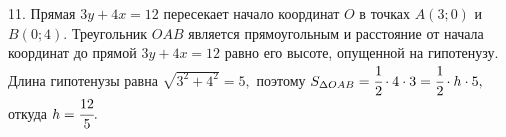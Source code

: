 11. Прямая $3y+4x=12$ пересекает начало координат $O$ в точках $A(3;0)$ и $B(0;4).$ Треугольник $OAB$ является прямоугольным и расстояние от начала координат до прямой $3y+4x=12$ равно его высоте, опущенной на гипотенузу. Длина гипотенузы равна $\sqrt{3^2+4^2}=5,$ поэтому $S_{\Delta OAB}=\cfrac{1}{2}\cdot4\cdot3=\cfrac{1}{2}\cdot h\cdot5,$ откуда $h=\cfrac{12}{5}.$\\
